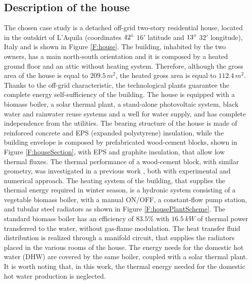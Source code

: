 \subsection{Description of the house}\label{SS:descriptionHouse}
The chosen case study is a detached off-grid two-story residential house, located in the outskirt of L'Aquila (coordinates $42\degree$ $16'$ latitude and $13\degree$ $32'$ longitude), Italy and is shown in Figure \ref{F:house}. The building, inhabited by the two owners, has a main north-south orientation and it is composed by a heated ground floor and an attic without heating system. Therefore, although the gross area of the house is equal to $209.5\,m^2$, the heated gross area is equal to $112.4\,m^2$.
Thanks to the off-grid characteristic, the technological plants guarantee the complete energy self-sufficiency of the building. The house is equipped with a biomass boiler, a solar thermal plant, a stand-alone photovoltaic system, black water and rainwater reuse systems and a well for water supply, and has complete independence from the utilities.   
The bearing structure of the house is made of reinforced concrete and EPS (expanded polystyrene) insulation, while the building envelope is composed by prefabricated wood-cement blocks, shown in Figure \ref{F:houseSection}, with EPS and graphite insulation, that allow low thermal fluxes. The thermal performance of a wood-cement block, with similar geometry, was investigated in a previous work \cite{Nardi2016}, both with experimental and numerical approach.
The heating system of the building, that supplies the thermal energy required in winter season, is a hydronic system consisting of a vegetable biomass boiler, with a manual ON/OFF, a constant-flow pump station, and tubular steel radiators as shown in Figure \ref{F:housePlantScheme}. The standard biomass boiler has an efficiency of $83.5\%$ with $16.5\ kW$ of thermal power transferred to the water, without gas-flame modulation. The heat transfer fluid distribution is realized through a manifold circuit, that supplies the radiators placed in the various rooms of the house. The energy needs for the domestic hot water (DHW) are covered by the same boiler, coupled with a solar thermal plant. It is worth noting that, in this work, the thermal energy needed for the domestic hot water production is neglected. 
